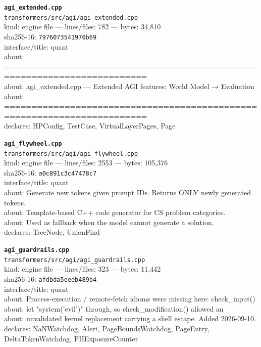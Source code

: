 \noindent\textbf{\texttt{agi\_extended.cpp}}\\
\texttt{transformers/src/agi/agi\_extended.cpp}\\
kind: engine file --- lines/files: 782 --- bytes: 34,810\\
sha256-16: \texttt{7976073541970b69}\\
interface/title: quant\\
about: ========================================================================\\
about: agi\_extended.cpp — Extended AGI features: World Model → Evaluation\\
about: ========================================================================\\
declares: HPConfig, TestCase, VirtualLayerPages, Page\\
\vspace*{6.0pt}

\noindent\textbf{\texttt{agi\_flywheel.cpp}}\\
\texttt{transformers/src/agi/agi\_flywheel.cpp}\\
kind: engine file --- lines/files: 2553 --- bytes: 105,376\\
sha256-16: \texttt{a0c891c3c47478c7}\\
interface/title: quant\\
about: Generate new tokens given prompt IDs. Returns ONLY newly generated tokens.\\
about: Template-based C++ code generator for CS problem categories.\\
about: Used as fallback when the model cannot generate a solution.\\
declares: TreeNode, UnionFind\\
\vspace*{6.0pt}

\noindent\textbf{\texttt{agi\_guardrails.cpp}}\\
\texttt{transformers/src/agi/agi\_guardrails.cpp}\\
kind: engine file --- lines/files: 323 --- bytes: 11,442\\
sha256-16: \texttt{afdbda5eeeb489b4}\\
interface/title: quant\\
about: Process-execution / remote-fetch idioms were missing here: check\_input()\\
about: let "system('evil')" through, so check\_modification() allowed an\\
about: unvalidated kernel replacement carrying a shell escape. Added 2026-09-10.\\
declares: NaNWatchdog, Alert, PageBoundsWatchdog, PageEntry, DeltaTokenWatchdog, PIIExposureCounter\\
\vspace*{6.0pt}

